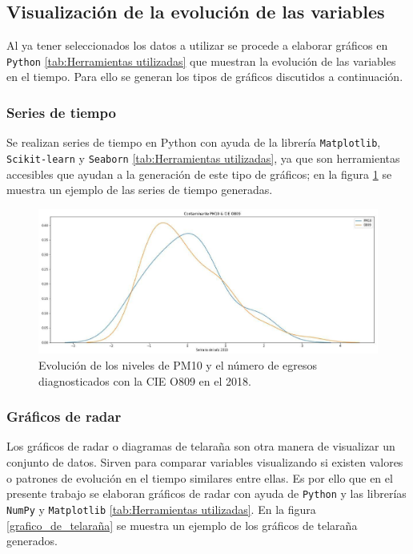 \subsection{Visualización de la evolución de las variables}
Al ya tener seleccionados los datos a utilizar se procede a elaborar gráficos en \texttt{Python} \ref{tab:Herramientas utilizadas} que muestran la evolución de las variables en el tiempo. Para ello se generan los tipos de gráficos discutidos a continuación.

\subsubsection{Series de tiempo}
Se realizan series de tiempo en Python con ayuda de la librería  \texttt{Matplotlib}, \texttt{Scikit-learn} y \texttt{Seaborn} \ref{tab:Herramientas utilizadas}, ya que son herramientas accesibles que ayudan a la generación de este tipo de gráficos; en la figura \ref{serie_de_tiempo} se muestra un ejemplo de las series de tiempo generadas.

\begin{figure}[h!]
\setcounter{figure}{0} %
\captionsetup{type=figure} %
\begin{center}
   \includegraphics[width=1\textwidth]{PM10_O809_2018.eps}
   \end{center}
    \caption[Ejemplo de series de tiempo]{Evolución de los niveles de PM10 y el número de egresos diagnosticados con la CIE O809 en el 2018.}
    \label{serie_de_tiempo}
\end{figure}

\subsubsection{Gráficos de radar}
Los gráficos de radar o diagramas de telaraña son otra manera de visualizar un conjunto de datos. Sirven para comparar variables visualizando si existen valores o patrones de evolución en el tiempo similares entre ellas. Es por ello que en el presente trabajo se elaboran gráficos de radar con ayuda de \texttt{Python} y las librerías \texttt{NumPy} y \texttt{Matplotlib} \ref{tab:Herramientas utilizadas}. En la figura \ref{grafico_de_telaraña} se muestra un ejemplo de los gráficos de telaraña generados.

